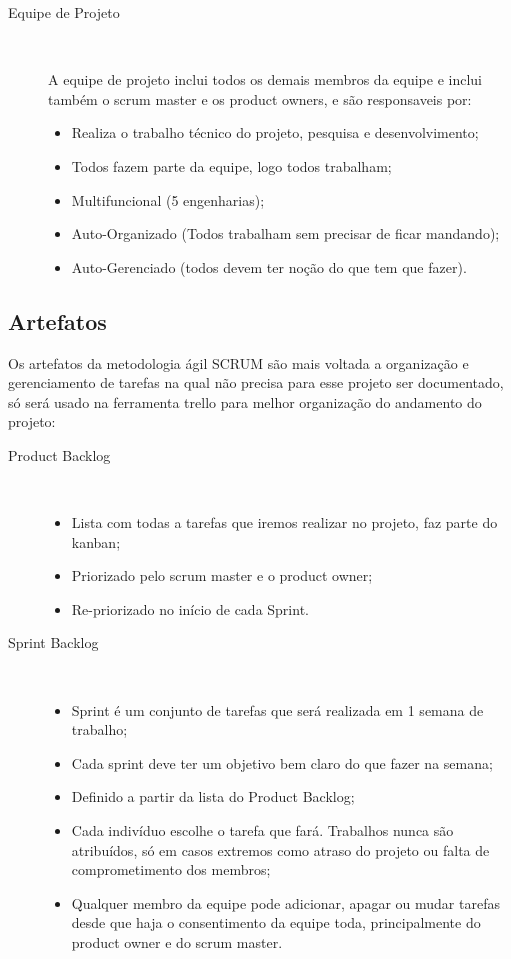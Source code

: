 \begin{description}
    \item[Equipe de Projeto] \

      A equipe de projeto inclui todos os demais membros da equipe e inclui também o scrum master e os product owners, e são responsaveis
      por:

      \begin{itemize}
        \item Realiza o trabalho técnico do projeto, pesquisa e desenvolvimento;
        \item Todos fazem parte da equipe, logo todos trabalham;
        \item Multifuncional (5 engenharias);
        \item Auto-Organizado (Todos trabalham sem precisar de ficar mandando);
        \item Auto-Gerenciado (todos devem ter noção do que tem que fazer).
      \end{itemize}

  \end{description}

\subsection{Artefatos}

  Os artefatos da metodologia ágil SCRUM são mais voltada a organização e gerenciamento de tarefas na qual não precisa para esse projeto
  ser documentado, só será usado na ferramenta trello para melhor organização do andamento do projeto:

  \begin{description}
    \item[Product Backlog] \
      \begin{itemize}
        \item Lista com todas a tarefas que iremos realizar no projeto, faz parte do kanban;
        \item Priorizado pelo scrum master e o product owner;
        \item Re-priorizado no início de cada Sprint.
      \end{itemize}
    \item[Sprint Backlog] \
      \begin{itemize}
        \item Sprint é um conjunto de tarefas que será realizada em 1 semana de trabalho;
        \item Cada sprint deve ter um objetivo bem claro do que fazer na semana;
        \item Definido a partir da lista do Product Backlog;
        \item Cada indivíduo escolhe o tarefa que fará. Trabalhos nunca são atribuídos, só em casos extremos como atraso do projeto ou
          falta de comprometimento dos membros;
        \item Qualquer membro da equipe pode adicionar, apagar ou mudar tarefas desde que haja o consentimento da equipe toda,
          principalmente do product owner e do scrum master.
      \end{itemize}
  \end{description}

